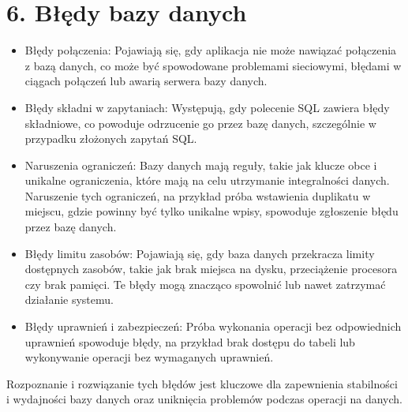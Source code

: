 \documentclass[letterpaper,10pt,polish]{sphinxmanual}
\begin{document}
\section{6. Błędy bazy danych}
\label{\detokenize{rozdzialy/rozdzial3:bledy-bazy-danych}}\begin{description}
\begin{itemize}
\item {} 
\sphinxAtStartPar
Błędy połączenia: Pojawiają się, gdy aplikacja nie może nawiązać połączenia z bazą danych, co może być spowodowane problemami sieciowymi, błędami w ciągach połączeń lub awarią serwera bazy danych.

\item {} 
\sphinxAtStartPar
Błędy składni w zapytaniach: Występują, gdy polecenie SQL zawiera błędy składniowe, co powoduje odrzucenie go przez bazę danych, szczególnie w przypadku złożonych zapytań SQL.

\item {} 
\sphinxAtStartPar
Naruszenia ograniczeń: Bazy danych mają reguły, takie jak klucze obce i unikalne ograniczenia, które mają na celu utrzymanie integralności danych. Naruszenie tych ograniczeń, na przykład próba wstawienia duplikatu w miejscu, gdzie powinny być tylko unikalne wpisy, spowoduje zgłoszenie błędu przez bazę danych.

\item {} 
\sphinxAtStartPar
Błędy limitu zasobów: Pojawiają się, gdy baza danych przekracza limity dostępnych zasobów, takie jak brak miejsca na dysku, przeciążenie procesora czy brak pamięci. Te błędy mogą znacząco spowolnić lub nawet zatrzymać działanie systemu.

\item {} 
\sphinxAtStartPar
Błędy uprawnień i zabezpieczeń: Próba wykonania operacji bez odpowiednich uprawnień spowoduje błędy, na przykład brak dostępu do tabeli lub wykonywanie operacji bez wymaganych uprawnień.

\end{itemize}

\end{description}

\sphinxAtStartPar
Rozpoznanie i rozwiązanie tych błędów jest kluczowe dla zapewnienia stabilności i wydajności bazy danych oraz uniknięcia problemów podczas operacji na danych.
\end{document}
